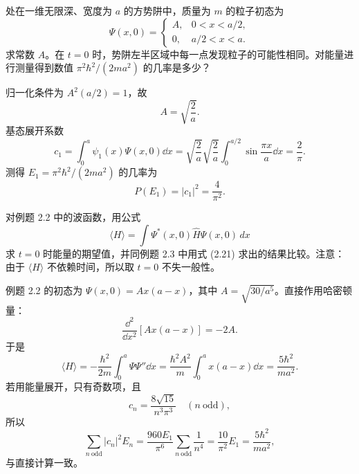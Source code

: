 \begin{question}
处在一维无限深、宽度为 $a$ 的方势阱中，质量为 $m$ 的粒子初态为
\[
\Psi(x,0)=
\begin{cases}
A, & 0<x<a/2,\\
0, & a/2<x<a.
\end{cases}
\]
求常数 $A$。在 $t=0$ 时，势阱左半区域中每一点发现粒子的可能性相同。对能量进行测量得到数值 $\pi^2\hbar^2/(2ma^2)$ 的几率是多少？
\end{question}
\begin{solution}
归一化条件为 $A^2(a/2)=1$，故
\[
A=\sqrt{\frac2a}.
\]
基态展开系数
\[
 c_1=\int_0^a\psi_1(x)\Psi(x,0)\dd x
 =\sqrt{\frac2a}\sqrt{\frac2a}\int_0^{a/2}\sin\frac{\pi x}{a}\dd x
 =\frac2\pi.
\]
测得 $E_1=\pi^2\hbar^2/(2ma^2)$ 的几率为
\[
P(E_1)=|c_1|^2=\frac4{\pi^2}.
\]
\end{solution}

\begin{question}
对例题 2.2 中的波函数，用公式
\[
\langle H\rangle=\int \Psi^*(x,0)\hat H\Psi(x,0)\,dx
\]
求 $t=0$ 时能量的期望值，并同例题 2.3 中用式 (2.21) 求出的结果比较。注意：由于 $\langle H\rangle$ 不依赖时间，所以取 $t=0$ 不失一般性。

\par\smallskip
{}

\end{question}
\begin{solution}
例题 2.2 的初态为 $\Psi(x,0)=A x(a-x)$，其中 $A=\sqrt{30/a^5}$。直接作用哈密顿量：
\[
\frac{\dd^2}{\dd x^2}[Ax(a-x)]=-2A.
\]
于是
\[
\langle H\rangle
=-\frac{\hbar^2}{2m}\int_0^a\Psi\Psi''\dd x
=\frac{\hbar^2A^2}{m}\int_0^a x(a-x)\dd x
=\frac{5\hbar^2}{ma^2}.
\]
若用能量展开，只有奇数项，且
\[
 c_n=\frac{8\sqrt{15}}{n^3\pi^3}\quad(n\ \mathrm{odd}),
\]
所以
\[
\sum_{n\ \mathrm{odd}} |c_n|^2E_n
=\frac{960E_1}{\pi^6}\sum_{n\ \mathrm{odd}}\frac1{n^4}
=\frac{10}{\pi^2}E_1
=\frac{5\hbar^2}{ma^2},
\]
与直接计算一致。
\end{solution}

